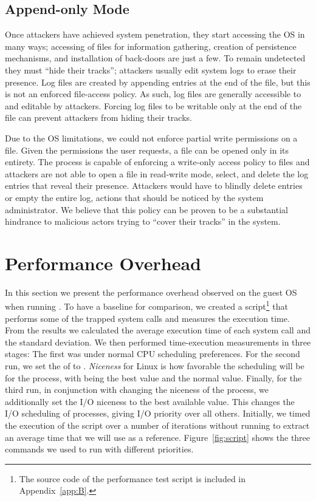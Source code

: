 \subsection{Append-only Mode}

\par Once attackers have achieved system penetration, they start accessing the \ac{OS} in many ways; accessing of files for information gathering, creation of persistence mechanisms, and installation of back-doors are just a few. To remain undetected they must ``hide their tracks''; attackers usually edit system logs to erase their presence. Log files are created by appending entries at the end of the file, but this is not an enforced file-access policy. As such, log files are generally accessible to and editable by attackers. Forcing log files to be writable only at the end of the file can prevent attackers from hiding their tracks.

\par Due to the \ac{OS} limitations, we could not enforce partial write permissions on a file. Given the permissions the user requests, a file can be opened only in its entirety. The  process is capable of enforcing a write-only access policy to files and attackers are not able to open a file in read-write mode, select, and delete the log entries that reveal their presence. Attackers would have to blindly delete entries or empty the entire log, actions that should be noticed by the system administrator. We believe that this policy can be proven to be a substantial hindrance to malicious actors trying to ``cover their tracks'' in the system.

\section{Performance Overhead}\label{sec:performance}

In this section we present the performance overhead observed on the guest \ac{OS} when running . To have a baseline for comparison, we created a  script\footnote{The source code of the performance test script is included in Appendix~\ref{app:B}.} that performs some of the trapped system calls and measures the execution time. From the results we calculated the average execution time of each system call and the standard deviation. We then performed time-execution measurements in three stages: The first was under normal \ac{CPU} scheduling preferences. For the second run, we set the  of  to . \emph{Niceness} for Linux is how favorable the scheduling will be for the process, with  being the best value and  the normal value. Finally, for the third run, in conjunction with changing the niceness of the process, we additionally set the \ac{I/O} niceness to the best available value. This changes the \ac{I/O} scheduling of processes, giving  \ac{I/O} priority over all others. Initially, we timed the execution of the script over a number of iterations without running  to extract an average time that we will use as a reference. Figure~\ref{fig:script} shows the three commands we used to run  with different priorities.

